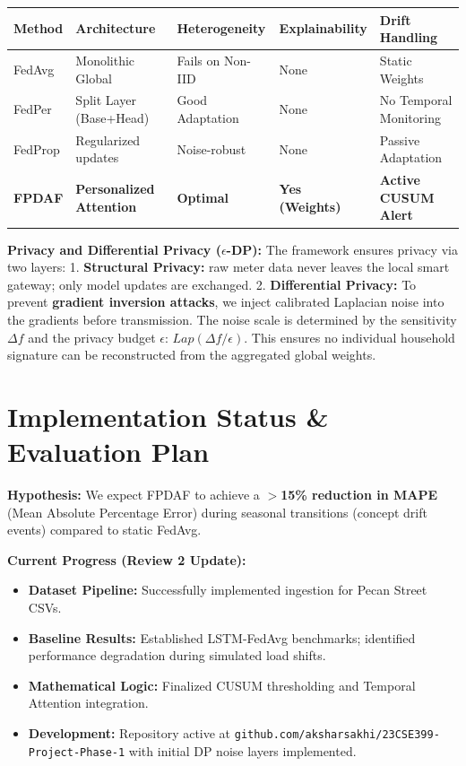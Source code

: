\documentclass[11pt, a4paper]{article}
\begin{document}
\begin{table}[H]
\centering
\small
\begin{tabular}{@{}lllll@{}}
\toprule
\textbf{Method} & \textbf{Architecture} & \textbf{Heterogeneity} & \textbf{Explainability} & \textbf{Drift Handling} \\ \midrule
FedAvg & Monolithic Global & Fails on Non-IID & None & Static Weights \\
FedPer & Split Layer (Base+Head) & Good Adaptation & None & No Temporal Monitoring \\
FedProp & Regularized updates & Noise-robust & None & Passive Adaptation \\ \midrule
\textbf{FPDAF} & \textbf{Personalized Attention} & \textbf{Optimal} & \textbf{Yes (Weights)} & \textbf{Active CUSUM Alert} \\ \bottomrule
\end{tabular}
\end{table}

\textbf{Privacy and Differential Privacy ($\epsilon$-DP):}
The framework ensures privacy via two layers:
1. \textbf{Structural Privacy:} raw meter data never leaves the local smart gateway; only model updates are exchanged.
2. \textbf{Differential Privacy:} To prevent \textbf{gradient inversion attacks}, we inject calibrated Laplacian noise into the gradients before transmission. The noise scale is determined by the sensitivity $\Delta f$ and the privacy budget $\epsilon$: $Lap(\Delta f / \epsilon)$. This ensures no individual household signature can be reconstructed from the aggregated global weights.


\section{Implementation Status \& Evaluation Plan}

\textbf{Hypothesis:} We expect FPDAF to achieve a \textbf{$>$15\% reduction in MAPE} (Mean Absolute Percentage Error) during seasonal transitions (concept drift events) compared to static FedAvg.

\textbf{Current Progress (Review 2 Update):}
\begin{itemize}[noitemsep]
\item \textbf{Dataset Pipeline:} Successfully implemented ingestion for Pecan Street CSVs.
\item \textbf{Baseline Results:} Established LSTM-FedAvg benchmarks; identified performance degradation during simulated load shifts.
\item \textbf{Mathematical Logic:} Finalized CUSUM thresholding and Temporal Attention integration.
\item \textbf{Development:} Repository active at \texttt{github.com/aksharsakhi/23CSE399-Project-Phase-1} with initial DP noise layers implemented.
\end{itemize}

\nocite{mcmahan2017,arivazhagan2020,jothimurugesan2022,larocca2021attention}


\end{document}
